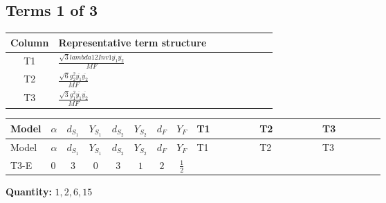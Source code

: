\documentclass[8pt]{article}
\begin{document}
\begin{landscape}
\subsection*{Terms 1 of 3}
\begin{center}
\begin{tabular}{@{}c >{\raggedright\arraybackslash}p{0.82\linewidth}@{}}
\toprule
Column & Representative term structure \\
\midrule
T1 & \(\displaystyle \frac{\sqrt{3} lambda12Inv1 \overline{y_{1}} \overline{y_{2}}}{MF}\) \\
\midrule
T2 & \(\displaystyle \frac{\sqrt{6} g_{2}^{2} \overline{y_{1}} \overline{y_{2}}}{MF}\) \\
\midrule
T3 & \(\displaystyle \frac{\sqrt{3} g_{1}^{2} \overline{y_{1}} \overline{y_{2}}}{MF}\) \\
\midrule
\bottomrule
\end{tabular}
\end{center}
\smallskip
\tiny
\begin{longtable}{@{}llcccccc >{\raggedright\arraybackslash}p{0.21\linewidth} >{\raggedright\arraybackslash}p{0.21\linewidth} >{\raggedright\arraybackslash}p{0.21\linewidth}@{}}
\toprule
Model & $\alpha$ & $d_{S_1}$ & $Y_{S_1}$ & $d_{S_2}$ & $Y_{S_2}$ & $d_F$ & $Y_F$ & T1 & T2 & T3 \\
\midrule
\endfirsthead
\toprule
Model & $\alpha$ & $d_{S_1}$ & $Y_{S_1}$ & $d_{S_2}$ & $Y_{S_2}$ & $d_F$ & $Y_F$ & T1 & T2 & T3 \\
\midrule
\endhead
T3-E & $0$ & $3$ & $0$ & $3$ & $1$ & $2$ & $\frac{1}{2}$ & \scriptsize\adjustbox{max width=\linewidth}{$\begin{gathered} - \frac{\sqrt{3} lambda12Inv1 \overline{y_{1}} \overline{y_{2}}}{6 MF}\end{gathered}$} & \scriptsize\adjustbox{max width=\linewidth}{$\begin{gathered} \frac{\sqrt{6} g_{2}^{2} \overline{y_{1}} \overline{y_{2}}}{6 MF}\end{gathered}$} & \scriptsize\adjustbox{max width=\linewidth}{$\begin{gathered} \frac{\sqrt{3} g_{1}^{2} \overline{y_{1}} \overline{y_{2}}}{8 MF}\end{gathered}$} \\
\midrule
\bottomrule
\end{longtable}
\clearpage
\noindent\textbf{Quantity: }$\mathrm{1,2,6,15}$\par\smallskip

\end{landscape}
\end{document}
